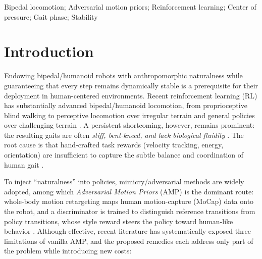 \documentclass[conference]{IEEEtran}
\begin{document}
\begin{IEEEkeywords}
Bipedal locomotion; Adversarial motion priors; Reinforcement learning; Center of pressure; Gait phase; Stability
\end{IEEEkeywords}

\section{Introduction}
\label{sec:introduction}

Endowing bipedal/humanoid robots with anthropomorphic naturalness while guaranteeing that every step remains dynamically stable is a prerequisite for their deployment in human-centered environments. Recent reinforcement learning (RL) has substantially advanced bipedal/humanoid locomotion, from proprioceptive blind walking \cite{singh2022footsteps} to perceptive locomotion over irregular terrain \cite{vanmarum2023perceptive, song2025gaitadaptive} and general policies over challenging terrain \cite{radosavovic2024challenging, huang2026coremoe}. A persistent shortcoming, however, remains prominent: the resulting gaits are often \emph{stiff, bent-kneed, and lack biological fluidity} \cite{zhang2025gmp}. The root cause is that hand-crafted task rewards (velocity tracking, energy, orientation) are insufficient to capture the subtle balance and coordination of human gait \cite{peng2021amp}.

To inject ``naturalness'' into policies, mimicry/adversarial methods are widely adopted, among which \emph{Adversarial Motion Priors} (AMP) \cite{peng2021amp} is the dominant route: whole-body motion retargeting maps human motion-capture (MoCap) data onto the robot, and a discriminator is trained to distinguish reference transitions from policy transitions, whose style reward steers the policy toward human-like behavior \cite{zhang2025gmp, guo2026tgmp}. Although effective, recent literature has systematically exposed three limitations of vanilla AMP, and the proposed remedies each address only part of the problem while introducing new costs:
\end{document}
